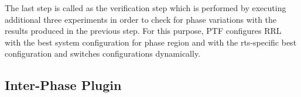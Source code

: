 The last step is called as the verification step which is performed by executing additional three experiments in order to check for phase variations with the results produced in the previous step. For this purpose, PTF configures RRL with the best system configuration for phase region and with the rts-specific best configuration and switches configurations dynamically.
 
\subsection{Inter-Phase Plugin} \label{sec:inter-phase}

